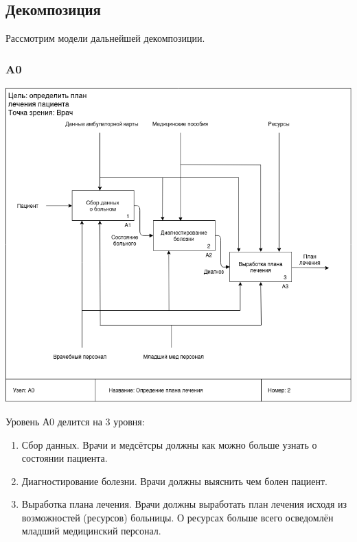 \documentclass[a4paper, 12pt]{article}
\begin{document}
\subsection{Декомпозиция}
Рассмотрим модели дальнейшей декомпозиции.
\subsubsection{A0}
\begin{center}
  \centering
  \includegraphics[width=1\linewidth]{extra/as-is_A0.png}
  \label{fig:prplot}
\end{center}
Уровень А0 делится на 3 уровня:
\begin{enumerate}
  \item Сбор данных. Врачи и медсётсры должны как можно больше узнать о состоянии пациента.
  \item Диагностирование болезни. Врачи должны выяснить чем болен пациент.
  \item Выработка плана лечения. Врачи должны выработать план лечения исходя из возможностей (ресурсов) больницы. О ресурсах больше всего осведомлён младший медицинский персонал.
\end{enumerate}
\end{document}
